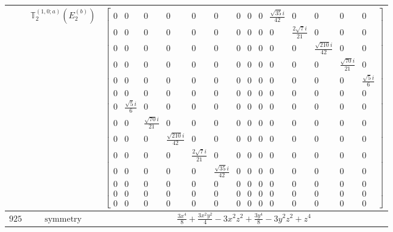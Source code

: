 \documentclass[fleqn,8pt,landscape]{jsarticle}
\begin{document}
\begin{longtable}{ccc}
$  $ & $ \mathbb{T}_{2}^{(1,0;a)}(E_{2}^{(b)}) $ & $ \begin{bmatrix} 0 & 0 & 0 & 0 & 0 & 0 & 0 & 0 & 0 & \frac{\sqrt{35} i}{42} & 0 & 0 & 0 & 0 \\ 0 & 0 & 0 & 0 & 0 & 0 & 0 & 0 & 0 & 0 & \frac{2 \sqrt{7} i}{21} & 0 & 0 & 0 \\ 0 & 0 & 0 & 0 & 0 & 0 & 0 & 0 & 0 & 0 & 0 & \frac{\sqrt{210} i}{42} & 0 & 0 \\ 0 & 0 & 0 & 0 & 0 & 0 & 0 & 0 & 0 & 0 & 0 & 0 & \frac{\sqrt{70} i}{21} & 0 \\ 0 & 0 & 0 & 0 & 0 & 0 & 0 & 0 & 0 & 0 & 0 & 0 & 0 & \frac{\sqrt{5} i}{6} \\ 0 & 0 & 0 & 0 & 0 & 0 & 0 & 0 & 0 & 0 & 0 & 0 & 0 & 0 \\ 0 & \frac{\sqrt{5} i}{6} & 0 & 0 & 0 & 0 & 0 & 0 & 0 & 0 & 0 & 0 & 0 & 0 \\ 0 & 0 & \frac{\sqrt{70} i}{21} & 0 & 0 & 0 & 0 & 0 & 0 & 0 & 0 & 0 & 0 & 0 \\ 0 & 0 & 0 & \frac{\sqrt{210} i}{42} & 0 & 0 & 0 & 0 & 0 & 0 & 0 & 0 & 0 & 0 \\ 0 & 0 & 0 & 0 & \frac{2 \sqrt{7} i}{21} & 0 & 0 & 0 & 0 & 0 & 0 & 0 & 0 & 0 \\ 0 & 0 & 0 & 0 & 0 & \frac{\sqrt{35} i}{42} & 0 & 0 & 0 & 0 & 0 & 0 & 0 & 0 \\ 0 & 0 & 0 & 0 & 0 & 0 & 0 & 0 & 0 & 0 & 0 & 0 & 0 & 0 \\ 0 & 0 & 0 & 0 & 0 & 0 & 0 & 0 & 0 & 0 & 0 & 0 & 0 & 0 \\ 0 & 0 & 0 & 0 & 0 & 0 & 0 & 0 & 0 & 0 & 0 & 0 & 0 & 0 \end{bmatrix} $ \\ \hline
$ 925 $ & $ \text{symmetry} $ & $ \frac{3 x^{4}}{8} + \frac{3 x^{2} y^{2}}{4} - 3 x^{2} z^{2} + \frac{3 y^{4}}{8} - 3 y^{2} z^{2} + z^{4} $ \\

\end{longtable}
\end{document}
